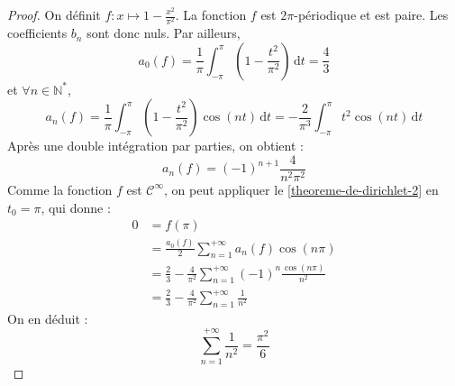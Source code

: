 	\begin{proof}
		On définit $f : x \mapsto 1 - \frac{x^2}{\pi^2}$. La fonction $f$ est $2\pi$-périodique et est paire. Les coefficients $b_n$ sont donc nuls. Par ailleurs,
		\[ a_0(f) = \frac{1}{\pi} \int_{-\pi}^{\pi} \left(1 - \frac{t^2}{\pi^2} \right) \, \mathrm{d}t = \frac{4}{3} \]
		et $\forall n \in \mathbb{N}^*$,
		\[ a_n(f) = \frac{1}{\pi} \int_{-\pi}^{\pi} \left(1 - \frac{t^2}{\pi^2} \right) \cos(nt) \, \mathrm{d}t = -\frac{2}{\pi^3} \int_{-\pi}^{\pi} t^2 \cos(nt) \, \mathrm{d}t \]
		Après une double intégration par parties, on obtient :
		\[ a_n(f) = (-1)^{n+1} \frac{4}{n^2 \pi^2} \]
		Comme la fonction $f$ est $\mathcal{C}^{\infty}$, on peut appliquer le \cref{theoreme-de-dirichlet-2} en $t_0 = \pi$, qui donne :
		\begin{align*}
			0 &= f(\pi) \\
			&= \frac{a_0(f)}{2} \sum_{n = 1}^{+\infty} a_n(f) \cos(n\pi) \\
			&= \frac{2}{3} - \frac{4}{\pi^2} \sum_{n = 1}^{+\infty} (-1)^n \frac{\cos(n\pi)}{n^2} \\
			&= \frac{2}{3} - \frac{4}{\pi^2} \sum_{n = 1}^{+\infty} \frac{1}{n^2}
		\end{align*}
		On en déduit :
		\[ \sum_{n=1}^{+\infty} \frac{1}{n^2} = \frac{\pi^2}{6} \]
	\end{proof}

